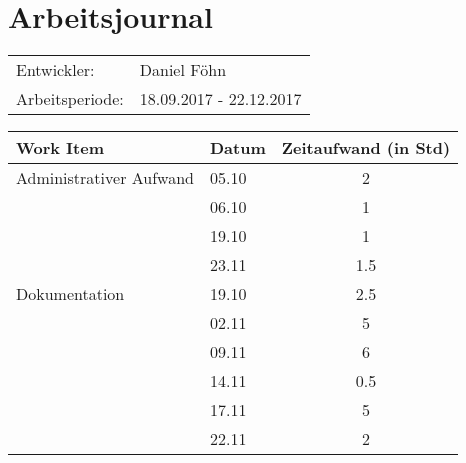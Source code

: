 \documentclass[a4paper, 10pt, fleqn]{article}
\newcommand{\header}{\textbf{Work Item}&\textbf{Datum}&\textbf{Zeitaufwand (in Std)}\\\toprule}
\begin{document}
	\section*{Arbeitsjournal}
    \begin{tabular}{ll}
        Entwickler: & Daniel Föhn \\
        Arbeitsperiode: & 18.09.2017 - 22.12.2017\\
    \end{tabular}
	\begin{table}[H]
		\centering
		\begin{tabular}{p{9cm}|p{2cm}|c}
            \header

            Administrativer Aufwand & 05.10 & 2\\
            & 06.10 & 1\\
            & 19.10 & 1\\
            & 23.11 & 1.5\\
            
            Dokumentation & 19.10 & 2.5\\
            & 02.11 & 5\\
            & 09.11 & 6\\
            & 14.11 & 0.5\\
            & 17.11 & 5\\
            & 22.11 & 2\\
            

\end{tabular}
\end{table}
\end{document}
